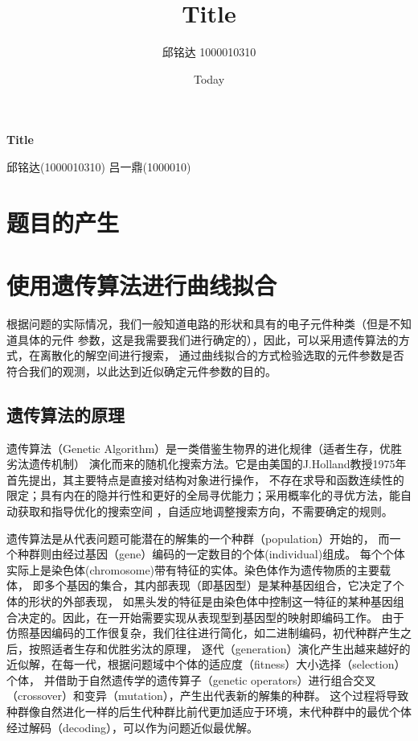 \documentclass[a4paper]{article}
\begin{document}
\title{Title}
\author{邱铭达 1000010310}
\date{Today}

%
%
\begin{center}
	\Huge \textbf{Title}
\end{center}
\vspace{1 in}
\begin{center}
	\normalsize 邱铭达(1000010310) 吕一鼎(1000010)
\end{center}
\newpage


\tableofcontents

\section{题目的产生}

%
\section{使用遗传算法进行曲线拟合}

根据问题的实际情况，我们一般知道电路的形状和具有的电子元件种类（但是不知道具体的元件
参数，这是我需要我们进行确定的），因此，可以采用遗传算法的方式，在离散化的解空间进行搜索，
通过曲线拟合的方式检验选取的元件参数是否符合我们的观测，以此达到近似确定元件参数的目的。

\subsection{遗传算法的原理}

遗传算法（Genetic Algorithm）是一类借鉴生物界的进化规律（适者生存，优胜劣汰遗传机制）
演化而来的随机化搜索方法。它是由美国的J.Holland教授1975年首先提出，其主要特点是直接对结构对象进行操作，
不存在求导和函数连续性的限定；具有内在的隐并行性和更好的全局寻优能力；采用概率化的寻优方法，能自动获取和指导优化的搜索空间
，自适应地调整搜索方向，不需要确定的规则。

遗传算法是从代表问题可能潜在的解集的一个种群（population）开始的，
而一个种群则由经过基因（gene）编码的一定数目的个体(individual)组成。
每个个体实际上是染色体(chromosome)带有特征的实体。染色体作为遗传物质的主要载体，
即多个基因的集合，其内部表现（即基因型）是某种基因组合，它决定了个体的形状的外部表现，
如黑头发的特征是由染色体中控制这一特征的某种基因组合决定的。因此，在一开始需要实现从表现型到基因型的映射即编码工作。
由于仿照基因编码的工作很复杂，我们往往进行简化，如二进制编码，初代种群产生之后，按照适者生存和优胜劣汰的原理，
逐代（generation）演化产生出越来越好的近似解，在每一代，根据问题域中个体的适应度（fitness）大小选择（selection）个体，
并借助于自然遗传学的遗传算子（genetic operators）进行组合交叉（crossover）和变异（mutation），产生出代表新的解集的种群。
这个过程将导致种群像自然进化一样的后生代种群比前代更加适应于环境，末代种群中的最优个体经过解码（decoding），可以作为问题近似最优解。
\end{document}
